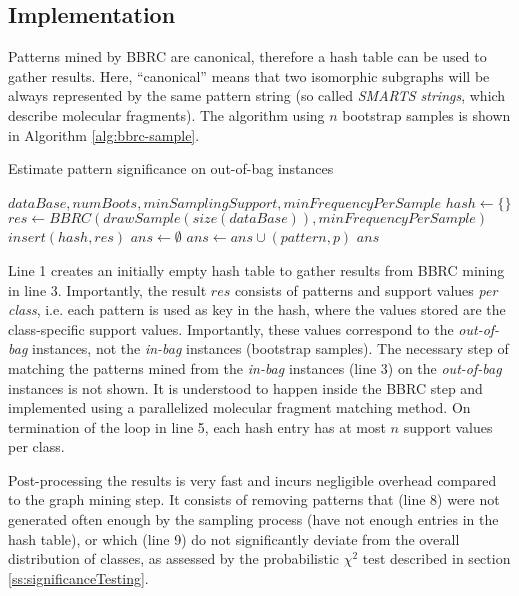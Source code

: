 \documentclass{article}
\begin{document}
\subsection{Implementation}
Patterns mined by BBRC are canonical, therefore a hash table can be used to gather results. Here, ``canonical'' means that two isomorphic subgraphs will be always represented by the same pattern string (so called \emph{SMARTS strings}, which describe molecular fragments). The algorithm using $n$ bootstrap samples is shown in Algorithm \ref{alg:bbrc-sample}.
\renewcommand{\algorithmicrequire}{\textbf{Input:}}
\renewcommand{\algorithmicensure}{\textbf{Output:}}
\begin{algorithm}
  \caption{Estimate pattern significance on out-of-bag instances}
  \label{alg:bbrc-sample}
\begin{algorithmic}[1]
  \Require $dataBase, numBoots, minSamplingSupport, minFrequencyPerSample$
  \State $hash \gets \{\}$
   
    \State $res \gets BBRC(drawSample(size(dataBase)), minFrequencyPerSample)$
    \State $insert(hash,res)$
  \EndFor
  \State $ans \gets \emptyset$
     
        \State $ans\gets ans \cup (pattern,p)$
      \EndIf
    \EndIf
  \EndFor
  \Ensure $ans$
\end{algorithmic}
\end{algorithm}

Line 1 creates an initially empty hash table to gather results from BBRC mining in line 3. Importantly, the result $res$ consists of patterns and support values \emph{per class}, i.e. each pattern is used as key in the hash, where the values stored are the class-specific support values. Importantly, these values correspond to the \emph{out-of-bag} instances, not the \emph{in-bag} instances (bootstrap samples). The necessary step of matching the patterns mined from the \emph{in-bag} instances (line 3) on the \emph{out-of-bag} instances is not shown. It is understood to happen inside the BBRC step and implemented using a parallelized molecular fragment matching method. On termination of the loop in line 5, each hash entry has at most $n$ support values per class.

Post-processing the results is very fast and incurs negligible overhead compared to the graph mining step. It consists of removing patterns that (line 8) were not generated often enough by the sampling process (have not enough entries in the hash table), or which (line 9) do not significantly deviate from the overall distribution of classes, as assessed by the probabilistic $\chi^2$ test described in section \ref{ss:significanceTesting}.
\end{document}

